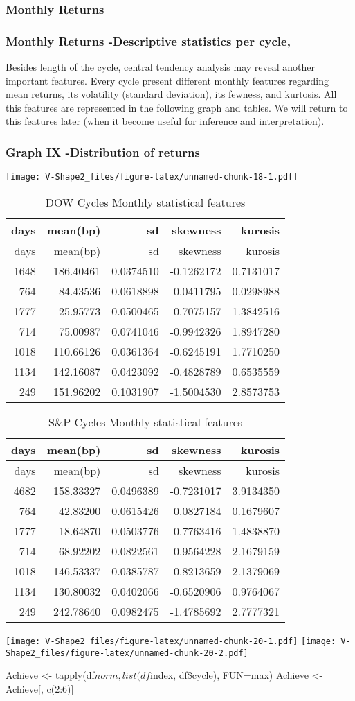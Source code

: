 \documentclass[
]{article}
\begin{document}
\hypertarget{monthly-returns}{%
\subsubsection{Monthly Returns}\label{monthly-returns}}

\hypertarget{monthly-returns--descriptive-statistics-per-cycle}{%
\subsubsection{Monthly Returns -Descriptive statistics per
cycle,}\label{monthly-returns--descriptive-statistics-per-cycle}}

Besides length of the cycle, central tendency analysis may reveal
another important features. Every cycle present different monthly
features regarding mean returns, its volatility (standard deviation),
its fewness, and kurtosis. All this features are represented in the
following graph and tables. We will return to this features later (when
it become useful for inference and interpretation).

\hypertarget{graph-ix--distribution-of-returns}{%
\subsubsection{Graph IX -Distribution of
returns}\label{graph-ix--distribution-of-returns}}

\texttt{[image: V-Shape2\_files/figure-latex/unnamed-chunk-18-1.pdf]}

\begin{longtable}[]{@{}rrrrr@{}}
\caption{DOW Cycles Monthly statistical features}\tabularnewline
\toprule
days & mean(bp) & sd & skewness & kurosis\tabularnewline
\midrule
\endfirsthead
\toprule
days & mean(bp) & sd & skewness & kurosis\tabularnewline
\midrule
\endhead
1648 & 186.40461 & 0.0374510 & -0.1262172 & 0.7131017\tabularnewline
764 & 84.43536 & 0.0618898 & 0.0411795 & 0.0298988\tabularnewline
1777 & 25.95773 & 0.0500465 & -0.7075157 & 1.3842516\tabularnewline
714 & 75.00987 & 0.0741046 & -0.9942326 & 1.8947280\tabularnewline
1018 & 110.66126 & 0.0361364 & -0.6245191 & 1.7710250\tabularnewline
1134 & 142.16087 & 0.0423092 & -0.4828789 & 0.6535559\tabularnewline
249 & 151.96202 & 0.1031907 & -1.5004530 & 2.8573753\tabularnewline
\bottomrule
\end{longtable}

\begin{longtable}[]{@{}rrrrr@{}}
\caption{S\&P Cycles Monthly statistical features}\tabularnewline
\toprule
days & mean(bp) & sd & skewness & kurosis\tabularnewline
\midrule
\endfirsthead
\toprule
days & mean(bp) & sd & skewness & kurosis\tabularnewline
\midrule
\endhead
4682 & 158.33327 & 0.0496389 & -0.7231017 & 3.9134350\tabularnewline
764 & 42.83200 & 0.0615426 & 0.0827184 & 0.1679607\tabularnewline
1777 & 18.64870 & 0.0503776 & -0.7763416 & 1.4838870\tabularnewline
714 & 68.92202 & 0.0822561 & -0.9564228 & 2.1679159\tabularnewline
1018 & 146.53337 & 0.0385787 & -0.8213659 & 2.1379069\tabularnewline
1134 & 130.80032 & 0.0402066 & -0.6520906 & 0.9764067\tabularnewline
249 & 242.78640 & 0.0982475 & -1.4785692 & 2.7777321\tabularnewline
\bottomrule
\end{longtable}

\texttt{[image: V-Shape2\_files/figure-latex/unnamed-chunk-20-1.pdf]}
\texttt{[image: V-Shape2\_files/figure-latex/unnamed-chunk-20-2.pdf]}

Achieve \textless- tapply(df\(norm, list(df\)index, df\$cycle), FUN=max)
Achieve \textless- Achieve{[}, c(2:6){]}
\end{document}
